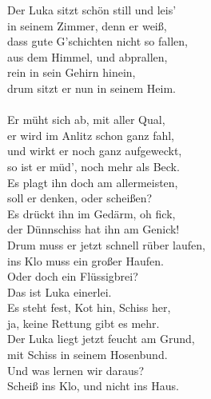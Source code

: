 \documentclass[11pt]{article}
\begin{document}
Der Luka sitzt schön still und leis'\\
in seinem Zimmer, denn er weiß,\\
dass gute G'schichten nicht so fallen,\\
aus dem Himmel, und abprallen,\\
rein in sein Gehirn hinein,\\
drum sitzt er nun in seinem Heim.\\
\\
Er müht sich ab, mit aller Qual,\\
er wird im Anlitz schon ganz fahl,\\
und wirkt er noch ganz aufgeweckt,\\
so ist er müd', noch mehr als Beck.\\
Es plagt ihn doch am allermeisten,\\
soll er denken, oder scheißen?\\
Es drückt ihn im Gedärm, oh fick,\\
der Dünnschiss hat ihn am Genick!\\
Drum muss er jetzt schnell rüber laufen,\\
ins Klo muss ein großer Haufen.\\
Oder doch ein Flüssigbrei?\\
Das ist Luka einerlei.\\
Es steht fest, Kot hin, Schiss her,\\
ja, keine Rettung gibt es mehr.\\
Der Luka liegt jetzt feucht am Grund,\\
mit Schiss in seinem Hosenbund.\\
Und was lernen wir daraus?\\
Scheiß ins Klo, und nicht ins Haus.
\end{document}
